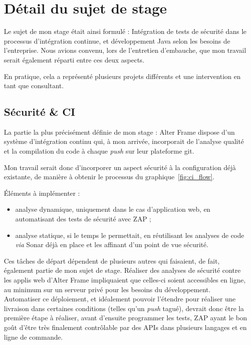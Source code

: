 \section{Détail du sujet de stage}
\label{sec:sujet}
Le sujet de mon stage était ainsi formulé : \og Intégration de tests de sécurité dans le processus d'intégration continue, et développement Java selon les besoins de l'entreprise. \fg Nous avions convenu, lors de l'entretien d'embauche, que mon travail serait également réparti entre ces deux aspects.

En pratique, cela a représenté plusieurs projets différents et une intervention en tant que consultant.

\subsection{Sécurité \& CI}
La partie la plus précisément définie de mon stage : Alter Frame dispose d'un système d'intégration continu qui, à mon arrivée, incorporait de l'analyse qualité et la compilation du code à chaque \textit{push} sur leur plateforme git.

Mon travail serait donc d'incorporer un aspect sécurité à la configuration déjà existante, de manière à obtenir le processus du graphique~\ref{fig:ci_flow}.

Éléments à implémenter :
\begin{itemize}
	\item analyse dynamique, uniquement dans le cas d'application web, en automatisant des tests de sécurité avec ZAP ;
	\item analyse statique, si le temps le permettait, en réutilisant les analyses de code \textit{via} Sonar déjà en place et les affinant d'un point de vue sécurité.
\end{itemize}
Ces tâches de départ dépendent de plusieurs autres qui faisaient, de fait, également partie de mon sujet de stage. Réaliser des analyses de sécurité contre les applis web d'Alter Frame impliquaient que celles-ci soient accessibles en ligne, au minimum sur un serveur privé pour les besoins du développement. Automatiser ce déploiement, et idéalement pouvoir l'étendre pour réaliser une livraison dans certaines conditions (telles qu'un \textit{push} tagué), devrait donc être la première étape à réaliser, avant d'ensuite programmer les tests, ZAP ayant le bon goût d'être très finalement contrôlable par des APIs dans plusieurs langages\cite{zap_api} et en ligne de commande\cite{zap_cli}\cite{zap_cli_wrapper}.

